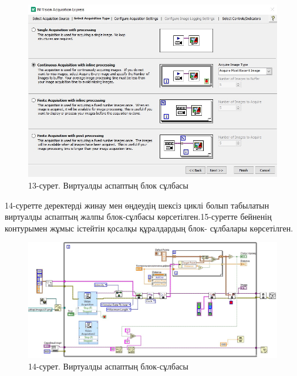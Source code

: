 \begin{figure}[H]
	\centering
	\includegraphics[width=\textwidth]{media/ict2/image181}
	\caption*{13-сурет. Виртуалды аспаптың блок сұлбасы}
\end{figure}

\begin{multicols}{2}
14-суретте деректерді жинау мен өңдеудің шексіз циклі болып табылатын
виртуалды аспаптың жалпы блок-сұлбасы көрсетілген.15-суретте бейненің
контурымен жұмыс істейтін қосалқы құралдардың блок- сұлбалары
көрсетілген.
\end{multicols}

\begin{figure}[H]
	\centering
	\includegraphics[width=\textwidth]{media/ict2/image182}
	\caption*{14-сурет. Виртуалды аспаптың блок-сұлбасы}
\end{figure}

